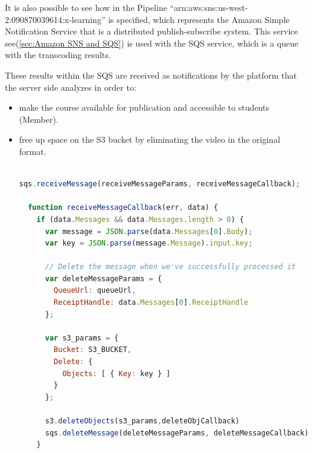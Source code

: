 It is also possible to see how in the Pipeline “arn:aws:sns:us-west-2:090870039614:x-learning” is specified, which represents the Amazon Simple Notification Service that is a distributed publish-subscribe system. 
This service see(\ref{sec:Amazon SNS and SQS}) is used with the SQS service, which is a queue with the transcoding results.

These results within the SQS are received as notifications by the platform that the server side analyzes in order to:


\begin{itemize}
\item make the course available for publication and accessible to students (Member).

\item free up space on the S3 bucket by eliminating the video in the original format.

\begin{lstlisting}[language=javascript]

sqs.receiveMessage(receiveMessageParams, receiveMessageCallback);

  function receiveMessageCallback(err, data) {
    if (data.Messages && data.Messages.length > 0) {
      var message = JSON.parse(data.Messages[0].Body);
      var key = JSON.parse(message.Message).input.key;
      
      // Delete the message when we've successfully processed it
      var deleteMessageParams = {
        QueueUrl: queueUrl,
        ReceiptHandle: data.Messages[0].ReceiptHandle
      };

      var s3_params = {
        Bucket: S3_BUCKET,
        Delete: { 
          Objects: [ { Key: key } ]
        }
      };
      
      s3.deleteObjects(s3_params,deleteObjCallback)
      sqs.deleteMessage(deleteMessageParams, deleteMessageCallback);
    }
    \end{lstlisting}

\end{itemize}




